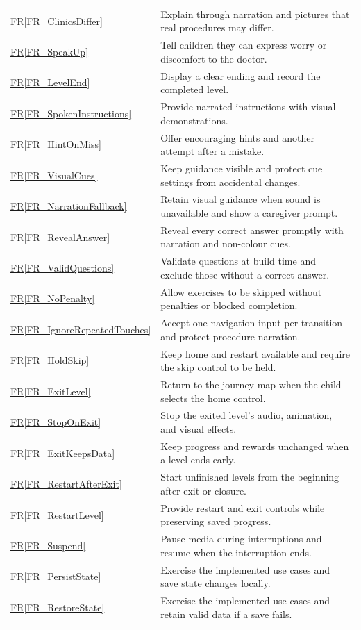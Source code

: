 \documentclass[10pt]{article}
\newcommand{\rref}[1]{\hyperref[#1]{FR\ref*{#1}}}
\begin{document}
\begin{longtable}{@{}>{\raggedright\arraybackslash}p{}
>{\raggedright\arraybackslash}p{}@{}}
\rref{FR_ClinicsDiffer} & Explain through narration and pictures that real procedures may differ. \\
\rref{FR_SpeakUp} & Tell children they can express worry or discomfort to the doctor. \\
\rref{FR_LevelEnd} & Display a clear ending and record the completed level. \\
\rref{FR_SpokenInstructions} & Provide narrated instructions with visual demonstrations. \\
\rref{FR_HintOnMiss} & Offer encouraging hints and another attempt after a mistake. \\
\rref{FR_VisualCues} & Keep guidance visible and protect cue settings from accidental changes. \\
\rref{FR_NarrationFallback} & Retain visual guidance when sound is unavailable and show a caregiver prompt. \\
\rref{FR_RevealAnswer} & Reveal every correct answer promptly with narration and non-colour cues. \\
\rref{FR_ValidQuestions} & Validate questions at build time and exclude those without a correct answer. \\
\rref{FR_NoPenalty} & Allow exercises to be skipped without penalties or blocked completion. \\
\rref{FR_IgnoreRepeatedTouches} & Accept one navigation input per transition and protect procedure narration. \\
\rref{FR_HoldSkip} & Keep home and restart available and require the skip control to be held. \\
\rref{FR_ExitLevel} & Return to the journey map when the child selects the home control. \\
\rref{FR_StopOnExit} & Stop the exited level's audio, animation, and visual effects. \\
\rref{FR_ExitKeepsData} & Keep progress and rewards unchanged when a level ends early. \\
\rref{FR_RestartAfterExit} & Start unfinished levels from the beginning after exit or closure. \\
\rref{FR_RestartLevel} & Provide restart and exit controls while preserving saved progress. \\
\rref{FR_Suspend} & Pause media during interruptions and resume when the interruption ends. \\
\rref{FR_PersistState} & Exercise the implemented use cases and save state changes locally. \\
\rref{FR_RestoreState} & Exercise the implemented use cases and retain valid data if a save fails.\\

\end{longtable}
\end{document}

